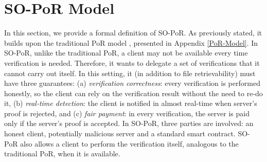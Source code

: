 



\section {SO-PoR Model}\label{SO-PoR-Model}
In this section, we provide a formal definition  of SO-PoR. As previously stated, it builds upon the traditional PoR model \cite{DBLP:conf/asiacrypt/ShachamW08}, presented in Appendix \ref{PoR-Model}.  In  SO-PoR, unlike the traditional PoR, a client may not be available every time  verification is needed. Therefore, it wants to  delegate  a set of verifications that it cannot carry out itself. In this setting, it (in addition to file retrievability)  must have three guarantees: (a) \emph{verification correctness}: every verification is performed honestly, so  the client can rely on the verification result  without the need to re-do it, (b) \emph{real-time detection}: the client is notified in almost real-time when server's  proof is rejected, and (c) \emph{fair payment}: in every verification, the server is paid only if the server's  proof  is accepted. In SO-PoR, three parties are involved: an honest client, potentially malicious server  and a standard smart contract. SO-PoR also allows a client to perform the verification itself, analogous to the traditional  PoR, when it is available. 



